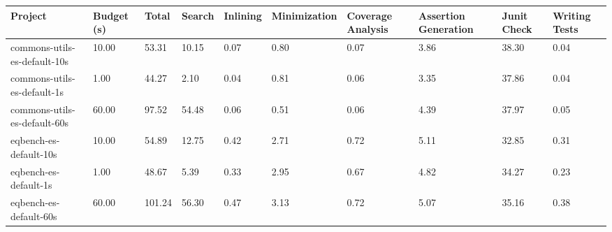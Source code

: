   \begin{tabular}{llllllllll}
  \toprule
  Project & Budget (s) & Total & Search & Inlining & Minimization & Coverage Analysis & Assertion Generation & Junit Check & Writing Tests \\
  \midrule
  commons-utils-es-default-10s & 10.00 & 53.31 & 10.15 & 0.07 & 0.80 & 0.07 & 3.86 & 38.30 & 0.04 \\
  commons-utils-es-default-1s & 1.00 & 44.27 & 2.10 & 0.04 & 0.81 & 0.06 & 3.35 & 37.86 & 0.04 \\
  commons-utils-es-default-60s & 60.00 & 97.52 & 54.48 & 0.06 & 0.51 & 0.06 & 4.39 & 37.97 & 0.05 \\
  eqbench-es-default-10s & 10.00 & 54.89 & 12.75 & 0.42 & 2.71 & 0.72 & 5.11 & 32.85 & 0.31 \\
  eqbench-es-default-1s & 1.00 & 48.67 & 5.39 & 0.33 & 2.95 & 0.67 & 4.82 & 34.27 & 0.23 \\
  eqbench-es-default-60s & 60.00 & 101.24 & 56.30 & 0.47 & 3.13 & 0.72 & 5.07 & 35.16 & 0.38 \\
  \bottomrule
  \end{tabular}
